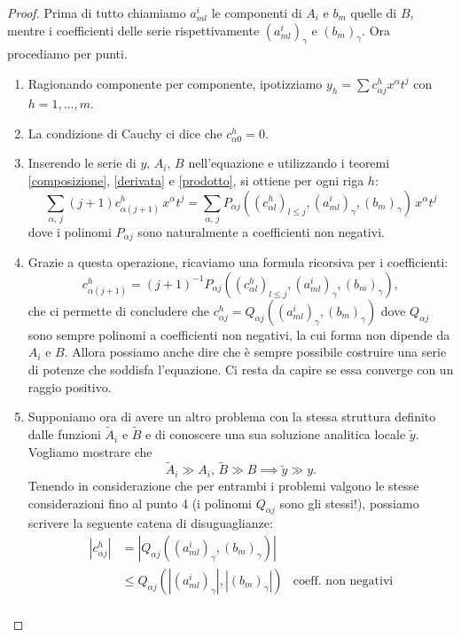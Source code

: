 \begin{proof}
Prima di tutto chiamiamo $a^i_{ml}$ le componenti di $A_i$  e $b_m$ quelle di $B$, mentre i coefficienti delle serie rispettivamente $(a^i_{ml})_\gamma$ e $(b_m)_\gamma$. Ora procediamo per punti.
\begin{enumerate}
\item Ragionando componente per componente, ipotizziamo $y_h = \sum c^h_{\alpha j} x^\alpha t^j$ con ${h=1,\ldots, m}$.
\item La condizione di Cauchy ci dice che $c^h_{\alpha 0}=0$.
\item Inserendo le serie di $y,\, A_i,\, B$ nell'equazione e utilizzando i teoremi \ref{composizione}, \ref{derivata} e \ref{prodotto}, si ottiene per ogni riga $h$:
$$\sum\limits_{\alpha, \, j} (j+1)c^h_{\alpha (j+1)}\, x^\alpha t^j = \sum\limits_{\alpha,\, j} P_{\alpha j}\left((c^h_{\alpha l})_{l\leq j},(a^i_{ml})_\gamma, (b_m)_\gamma\right) \, x^\alpha t^j$$
dove i polinomi $P_{\alpha j}$ sono naturalmente a coefficienti non negativi.
\item Grazie a questa operazione, ricaviamo una formula ricorsiva per i coefficienti:
$$ c^h_{\alpha (j+1)}= (j+1)^{-1} P_{\alpha j}\left((c^h_{\alpha l})_{l\leq j},(a^i_{ml})_\gamma, (b_m)_\gamma\right),$$
che ci permette di concludere che $c^h_{\alpha j} = Q_{\alpha j}\left((a^i_{ml})_\gamma, (b_m)_\gamma\right)$ dove $Q_{\alpha j}$ sono sempre polinomi a coefficienti non negativi, la cui forma non dipende da $A_i$ e $B$. Allora possiamo anche dire che è sempre possibile costruire una serie di potenze che soddisfa l'equazione. Ci resta da capire se essa converge con un raggio positivo.
\newpage
\item Supponiamo ora di avere un altro problema con la stessa struttura definito dalle funzioni $\widetilde{A}_i $ e $\widetilde{B}$ e di conoscere una sua soluzione analitica locale $\widetilde{y}$. Vogliamo mostrare che $$\widetilde{A}_i \gg A_i, \, \widetilde{B} \gg B \implies \widetilde{y} \gg y.$$
Tenendo in considerazione che per entrambi i problemi valgono le stesse considerazioni fino al punto 4 (i polinomi $Q_{\alpha j}$ sono gli stessi!), possiamo scrivere la seguente catena di disuguaglianze:
\begin{align*}
\left|c^h_{\alpha j}\right| &= \left|Q_{\alpha j}\left((a^i_{ml})_\gamma, (b_m)_\gamma\right)\right|\\
&\leq Q_{\alpha j}\left(\left|(a^i_{ml})_\gamma\right|, \left|(b_m)_\gamma\right|\right) 
& \text{coeff. non negativi}\\

\end{align*}
\end{enumerate}
\end{proof}
